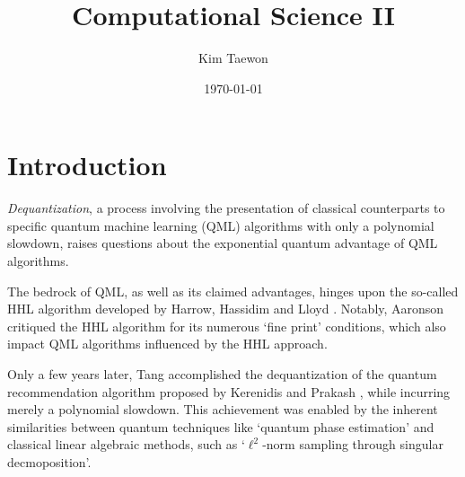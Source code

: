 \documentclass[a4paper,atbegshi]{memoir}
\title{Computational Science II}
\author{Kim Taewon}
\date{\today}
\begin{document}
\maketitle\thispagestyle{empty}
\newpage
\tableofcontents
\chapter{Introduction}
\emph{Dequantization}, a process involving the presentation of classical 
counterparts to specific quantum machine learning (QML) algorithms with only a
polynomial slowdown, raises questions about the exponential quantum advantage
of QML algorithms. 

The bedrock of QML, as well as its claimed advantages,
hinges upon the so-called HHL algorithm developed by Harrow, Hassidim
and Lloyd \cite{HHL2009}. Notably, Aaronson \cite{Aaronson2015} critiqued the
HHL algorithm for its numerous `fine print' conditions, which also impact QML
algorithms influenced by the HHL approach. 

Only a few years later, Tang 
\cite{Tang2019} accomplished the dequantization of the quantum recommendation
algorithm proposed by Kerenidis and Prakash \cite{KP2017}, while incurring merely
a polynomial slowdown. This achievement was enabled by the inherent similarities
between quantum techniques like `quantum phase estimation' and classical linear
algebraic methods, such as `$\ell^2$-norm sampling through singular decmoposition'.


\end{document}
